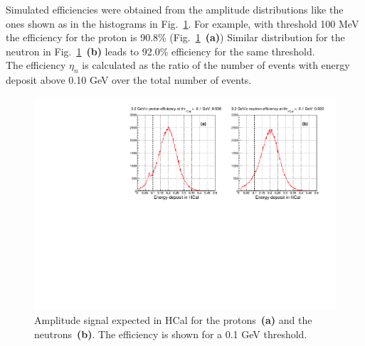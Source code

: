 \documentclass[11pt]{article}
\begin{document}
Simulated efficiencies were obtained from the amplitude distributions like the ones shown as in the histograms in Fig.~\ref{fig:Neff}.
For example, with threshold 100 MeV the efficiency for the proton is 90.8\% (Fig.~\ref{fig:Neff}~{\bf(a)}) Similar distribution for the neutron in Fig.~\ref{fig:Neff}~{\bf(b)} leads to 92.0\% efficiency for the same threshold.\\
The efficiency $\eta_{n}$ is calculated as the ratio of the number of events with energy deposit above 0.10 GeV over the total number of events.
%
\begin{figure}[!h]
  \centering
  \includegraphics[width=12cm]{ProtVsNeut_MC.pdf}
  \caption{Amplitude signal expected in HCal for the protons~{\bf(a)} and the neutrons~{\bf(b)}. The efficiency is shown for a 0.1 GeV threshold.}
  \label{fig:Neff}
\end{figure}
%
%
%
\end{document}

